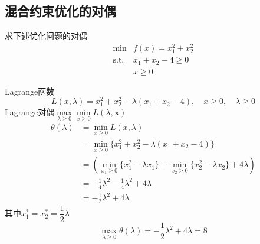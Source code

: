 \subsection{混合约束优化的对偶}
\begin{example}
    求下述优化问题的对偶
    \[
        \begin{array}{rl}
            \operatorname*{min}&f(x)=x_{1}^{2}+x_{2}^{2}\\
            \mathrm{s.t.} & x_{1}+x_{2}-4\geq 0\\
            &x\geq 0
        \end{array}    
    \]
    \begin{solution}
        Lagrange函数
        \[
            L(x,\lambda)=x_{1}^{2}+x_{2}^{2}-\lambda(x_{1}+x_{2}-4),\quad x\geq 0,\quad\lambda\geq 0
        \]
        Lagrange对偶$\max\limits_{\lambda\geqslant 0}\min\limits_{x\geqslant 0}L(\lambda,\boldsymbol{x})$
        \[
            \begin{aligned}
                \theta(\lambda)& =\min_{x\geq0}L(x,\lambda)  \\
                &=\min_{x\geq0}\{x_{1}^{2}+x_{2}^{2}-\lambda(x_{1}+x_{2}-4)\} \\
                &=\left(\operatorname*{min}_{x_{1}\geq0}\{x_{1}^{2}-\lambda x_{1}\}+\operatorname*{min}_{x_{2}\geq0}\{x_{2}^{2}-\lambda x_{2}\}+4\lambda\right) \\
                &=-\frac14\lambda^{2}-\frac14\lambda^{2}+4\lambda  \\
                &=-\frac{1}{2}\lambda^{2}+4\lambda 
            \end{aligned}  
        \]
        其中$x_1^* = x_2^* = \dfrac{1}{2}\lambda$
        \[
            \max_{\lambda\geq 0}\theta(\lambda)=-\frac{1}{2}\lambda^{2}+4\lambda=8
        \]
    \end{solution}    
\end{example}
